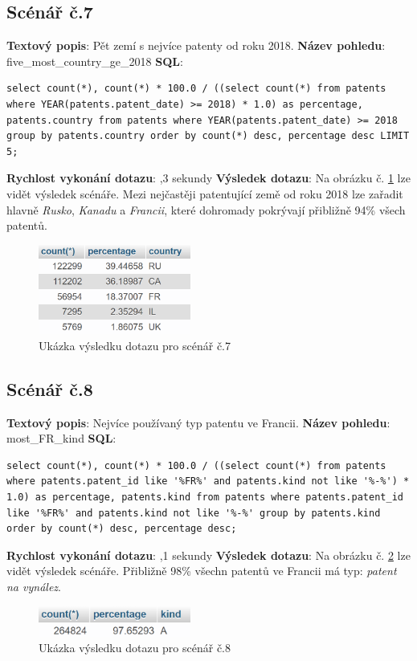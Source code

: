 \subsection{Scénář č.7}
\textbf{Textový popis}: Pět zemí s nejvíce patenty od roku 2018.
\newline
\textbf{Název pohledu}: five\_most\_country\_ge\_2018
\newline
\textbf{SQL}: 
\begin{lstlisting}[label = {lst:elements_a}]
select count(*), count(*) * 100.0 / ((select count(*) from patents where YEAR(patents.patent_date) >= 2018) * 1.0) as percentage, patents.country from patents where YEAR(patents.patent_date) >= 2018 group by patents.country order by count(*) desc, percentage desc LIMIT 5;
\end{lstlisting}
\textbf{Rychlost vykonání dotazu}: ,3 sekundy
\newline
\textbf{Výsledek dotazu}: Na obrázku č. \ref{fig:scenar7} lze vidět výsledek scénáře. Mezi nejčastěji patentující země od roku 2018 lze zařadit hlavně \textit{Rusko}, \textit{Kanadu} a \textit{Francii}, které dohromady pokrývají přibližně 94\% všech patentů.
\begin{figure}[H]
\centering
\includegraphics[width=5cm]{img/scenare/scenar_7}
\caption{Ukázka výsledku dotazu pro scénář č.7}
\label{fig:scenar7}
\end{figure}

\newpage
\subsection{Scénář č.8}
\textbf{Textový popis}: Nejvíce používaný typ patentu ve Francii.
\newline
\textbf{Název pohledu}: most\_FR\_kind
\newline
\textbf{SQL}: 
\begin{lstlisting}[label = {lst:elements_a}]
select count(*), count(*) * 100.0 / ((select count(*) from patents where patents.patent_id like '%FR%' and patents.kind not like '%-%') * 1.0) as percentage, patents.kind from patents where patents.patent_id like '%FR%' and patents.kind not like '%-%' group by patents.kind order by count(*) desc, percentage desc;
\end{lstlisting}
\textbf{Rychlost vykonání dotazu}: ,1 sekundy
\newline
\textbf{Výsledek dotazu}: Na obrázku č. \ref{fig:scenar8} lze vidět výsledek scénáře. Přibližně 98\% všechn patentů ve Francii má typ: \textit{patent na vynález}.
\begin{figure}[H]
\centering
\includegraphics[width=5cm]{img/scenare/scenar_8}
\caption{Ukázka výsledku dotazu pro scénář č.8}
\label{fig:scenar8}
\end{figure}

